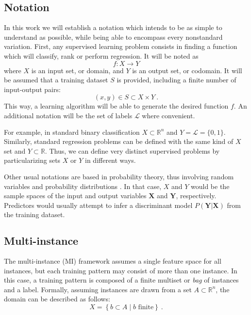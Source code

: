 \subsection{Notation}
\label{p3sec:notation}

In this work we will establish a notation which intends to be as simple to understand as possible, while being able to encompass every nonstandard variation. First, any supervised learning problem consists in finding a function which will classify, rank or perform regression. It will be noted as
\begin{equation}
  f: X\rightarrow Y
\end{equation}
where $X$ is an input set, or domain, and $Y$ is an output set, or codomain. It will be assumed that a training dataset $S$ is provided, including a finite number of input-output pairs:
\begin{equation}
  (x, y)\in S\subset X\times Y~.
\end{equation}
This way, a learning algorithm will be able to generate the desired function $f$. An additional notation will be the set of labels $\mathcal L$ where convenient. 

For example, in standard binary classification $X\subset\mathbb R^n$ and $Y=\mathcal L=\{0, 1\}$. Similarly, standard regression problems can be defined with the same kind of $X$ set and $Y\subset \mathbb R$. Thus, we can define very distinct supervised problems by particularizing sets $X$ or $Y$ in different ways.

Other usual notations are based in probability theory, thus involving random variables and probability distributions . In that case, $X$ and $Y$ would be the sample spaces of the input and output variables $\mathbf X$ and $\mathbf Y$, respectively. Predictors would usually attempt to infer a discriminant model $P(\mathbf Y|\mathbf X)$ from the training dataset.

\subsection{Multi-instance}
\label{p3sec:minstance}

The multi-instance (MI) framework  assumes a single feature space for all instances, but each training pattern may consist of more than one instance. In this case, a training pattern is composed of a finite multiset or \emph{bag} of instances and a label. Formally, assuming instances are drawn from a set $A\subset\mathbb R^n$, the domain can be described as follows:
\begin{equation}
  X=\left\{b\subset A\mid b \mbox{ finite}\right\}~.
  \end{equation} 

